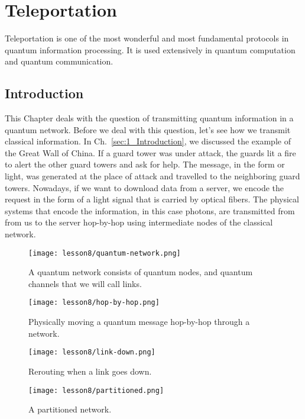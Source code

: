 \chapter{Teleportation}
\label{sec:8_teleportation}

Teleportation is one of the most wonderful and most fundamental protocols in quantum information processing.
It is used extensively in quantum computation and quantum communication.

\section{Introduction}
\label{sec:8-1_introduction}

This Chapter deals with the question of transmitting quantum information in a quantum network.
Before we deal with this question, let's see how we transmit classical information.
In Ch.~\ref{sec:1_Introduction}, we discussed the example of the Great Wall of China.
If a guard tower was under attack, the guards lit a fire to alert the other guard towers and ask for help.
The message, in the form or light, was generated at the place of attack and travelled to the neighboring guard towers.
Nowadays, if we want to download data from a server, we encode the request in the form of a light signal that is carried by optical fibers.
The physical systems that encode the information, in this case photons, are transmitted from from us to the server hop-by-hop using intermediate nodes of the classical network.
\begin{figure}[H]
    \centering
    \texttt{[image: lesson8/quantum-network.png]}
    \caption[A quantum network of nodes and channels.]{A quantum network consists of quantum nodes, and quantum channels that we will call links.}
    \label{fig:quantum-network}
\end{figure}
\begin{figure}[H]
    \centering
    \texttt{[image: lesson8/hop-by-hop.png]}
        \caption[Hop-by-hop transmission.]{Physically moving a quantum message hop-by-hop through a network.}
    \label{fig:hop-by-hop}
\end{figure}
\begin{figure}[H]
    \centering
    \texttt{[image: lesson8/link-down.png]}
        \caption{Rerouting when a link goes down.}
    \label{fig:link-down}
\end{figure}
\begin{figure}[H]
    \centering
    \texttt{[image: lesson8/partitioned.png]}
        \caption{A partitioned network.}
    \label{fig:partition}
\end{figure}

